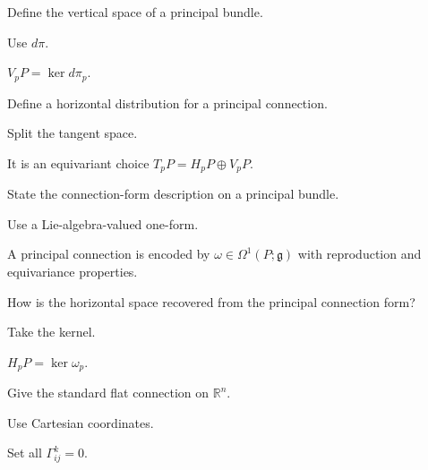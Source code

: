 \begin{exercise}\label{exr:vii21-19}
Define the vertical space of a principal bundle.
\end{exercise}
\begin{hint}
Use \(d\pi\).
\end{hint}
\begin{solution}
\(V_pP=\ker d\pi_p\).
\end{solution}

\begin{exercise}\label{exr:vii21-20}
Define a horizontal distribution for a principal connection.
\end{exercise}
\begin{hint}
Split the tangent space.
\end{hint}
\begin{solution}
It is an equivariant choice \(T_pP=H_pP\oplus V_pP\).
\end{solution}

\begin{exercise}\label{exr:vii21-21}
State the connection-form description on a principal bundle.
\end{exercise}
\begin{hint}
Use a Lie-algebra-valued one-form.
\end{hint}
\begin{solution}
A principal connection is encoded by \(\omega\in\Omega^1(P;\mathfrak g)\) with reproduction and equivariance properties.
\end{solution}

\begin{exercise}\label{exr:vii21-22}
How is the horizontal space recovered from the principal connection form?
\end{exercise}
\begin{hint}
Take the kernel.
\end{hint}
\begin{solution}
\(H_pP=\ker\omega_p\).
\end{solution}

\begin{exercise}\label{exr:vii21-23}
Give the standard flat connection on \(\mathbb R^n\).
\end{exercise}
\begin{hint}
Use Cartesian coordinates.
\end{hint}
\begin{solution}
Set all \(\Gamma^k_{ij}=0\).
\end{solution}

